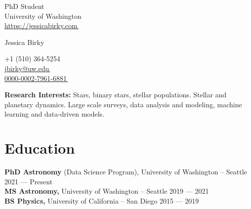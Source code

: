 \documentclass[a4,11pt]{article}
\makeatletter
\def\blfootnote{\xdef\@thefnmark{}\@footnotetext}
\let\orighref\href
\renewcommand{\href}[2]{\orighref{#1}{#2\,\scriptsize\faExternalLink}}
\makeatother
\begin{document}
\begin{center}
    \begin{minipage}[b]{0.24\textwidth}
            \flushleft  
            PhD Student \\
            University of Washington \\
            {\href{https://jessicabirky.com}{https://jessicabirky.com} } \\
    \end{minipage}   
    \begin{minipage}[b]{0.5\textwidth}
            \centering
            {\Huge Jessica Birky} \\ %
            \vspace{0.1cm}
    \end{minipage}%
    \begin{minipage}[b]{0.24\textwidth}
            \flushright
            +1 (510) 364-5254 \\
            \href{mailto:jbirky@uw.edu}{jbirky@uw.edu} \\
            \href{https://orcid.org/0000-0002-7961-6881}{0000-0002-7961-6881}
    \end{minipage}%

\blfootnote{\centering\normalsize\color{gray} \textit{[Last updated: \today]}}
    
\vspace{-0.15cm} 
{\color{UI_blue} \hrulefill}
\end{center}
\textbf{Research Interests:} Stars, binary stars, stellar populations. Stellar and planetary dynamics. Large scale surveys, data analysis and modeling, machine learning and data-driven models. 
\vspace{-0.2cm}

\section{Education }
\textbf{PhD Astronomy} (Data Science Program), University of Washington -- Seattle \hfill 2021 --- Present \\ 
\vspace{0.1cm}
\textbf{MS Astronomy,} University of Washington -- Seattle \hfill 2019 --- 2021 \\
\vspace{0.1cm}
\textbf{BS Physics,} University of California -- San Diego \hfill 2015 --- 2019
\end{document}
